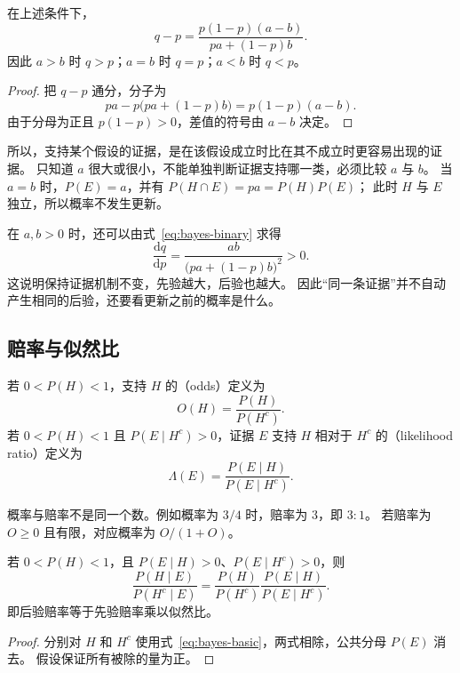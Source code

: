 \documentclass[UTF8]{ctexart}
\begin{document}
\begin{proposition}[概率更新的方向]
\label{prop:bayes-direction}
在上述条件下，
\begin{equation}
  q-p=\frac{p(1-p)(a-b)}{pa+(1-p)b}.
  \label{eq:bayes-direction}
\end{equation}
因此 $a>b$ 时 $q>p$；$a=b$ 时 $q=p$；$a<b$ 时 $q<p$。
\end{proposition}
\begin{proof}
把 $q-p$ 通分，分子为
\[
  pa-p\bigl(pa+(1-p)b\bigr)=p(1-p)(a-b).
\]
由于分母为正且 $p(1-p)>0$，差值的符号由 $a-b$ 决定。
\end{proof}

所以，支持某个假设的证据，是在该假设成立时比在其不成立时更容易出现的证据。
只知道 $a$ 很大或很小，不能单独判断证据支持哪一类，必须比较 $a$ 与 $b$。
当 $a=b$ 时，$P(E)=a$，并有 $P(H\cap E)=pa=P(H)P(E)$；
此时 $H$ 与 $E$ 独立，所以概率不发生更新。

在 $a,b>0$ 时，还可以由式~\eqref{eq:bayes-binary} 求得
\[
  \frac{\mathrm dq}{\mathrm dp}
  =\frac{ab}{\bigl(pa+(1-p)b\bigr)^2}>0.
\]
这说明保持证据机制不变，先验越大，后验也越大。
因此“同一条证据”并不自动产生相同的后验，还要看更新之前的概率是什么。

\subsection{赔率与似然比}

\begin{definition}[赔率与似然比]
若 $0<P(H)<1$，支持 $H$ 的（odds）定义为
\[
  O(H)=\frac{P(H)}{P(H^c)}.
\]
若 $0<P(H)<1$ 且 $P(E\mid H^c)>0$，证据 $E$ 支持 $H$ 相对于 $H^c$ 的（likelihood ratio）定义为
\[
  \Lambda(E)=\frac{P(E\mid H)}{P(E\mid H^c)}.
\]
\end{definition}

概率与赔率不是同一个数。例如概率为 $3/4$ 时，赔率为 $3$，即 $3:1$。
若赔率为 $O\geq0$ 且有限，对应概率为 $O/(1+O)$。

\begin{theorem}[贝叶斯公式的赔率形式]
\label{thm:bayes-odds}
若 $0<P(H)<1$，且 $P(E\mid H)>0$、$P(E\mid H^c)>0$，则
\begin{equation}
  \frac{P(H\mid E)}{P(H^c\mid E)}
  =\frac{P(H)}{P(H^c)}
   \frac{P(E\mid H)}{P(E\mid H^c)}.
  \label{eq:bayes-odds}
\end{equation}
即后验赔率等于先验赔率乘以似然比。
\end{theorem}
\begin{proof}
分别对 $H$ 和 $H^c$ 使用式~\eqref{eq:bayes-basic}，两式相除，公共分母 $P(E)$ 消去。
假设保证所有被除的量为正。
\end{proof}
\end{document}
